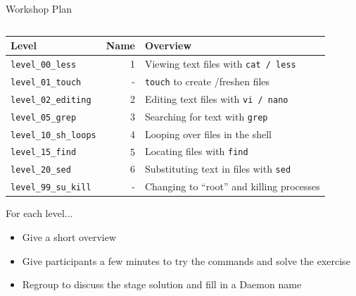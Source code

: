 \documentclass[mathserif]{beamer}
\begin{document}
\begin{frame}[label={sec:org109514e},fragile]{Workshop Plan}
 \vspace{-.2in}
\begin{columns}
\begin{column}{1.1\columnwidth}
\begin{block}{}
\begin{center}
\begin{tabular}{lrl}
\hline
Level & Name & Overview\\
\hline
\texttt{level\_00\_less} & 1 & Viewing text files with \texttt{cat / less}\\
\texttt{level\_01\_touch} & - & \texttt{touch} to create /freshen files\\
\texttt{level\_02\_editing} & 2 & Editing text files with \texttt{vi / nano}\\
\texttt{level\_05\_grep} & 3 & Searching for text with \texttt{grep}\\
\texttt{level\_10\_sh\_loops} & 4 & Looping over files in the shell\\
\texttt{level\_15\_find} & 5 & Locating files with \texttt{find}\\
\texttt{level\_20\_sed} & 6 & Substituting text in files with \texttt{sed}\\
\texttt{level\_99\_su\_kill} & - & Changing to ``root'' and killing processes\\
\hline
\end{tabular}
\end{center}

For each level...
\begin{itemize}
\item Give a short overview
\item Give participants a few minutes to try the commands and solve the exercise
\item Regroup to discuss the stage solution and fill in a Daemon name
\end{itemize}
\end{block}
\end{column}
\end{columns}
\end{frame}
\end{document}
